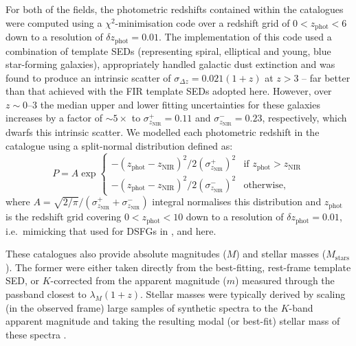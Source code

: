 \documentclass[a4paper, fleqn, usenatbib]{mnras}
\newcommand{\angstrom}{\text{\AA}}
\newcommand{\mstars}{M_{\text{stars}}}
\newcommand{\znir}{z_{\text{NIR}}}
\newcommand{\zphot}{z_{\text{phot}}}
\begin{document}
For both of the fields, the photometric redshifts contained within the catalogues were computed using a $\chi^2$-minimisation code \citep{arnouts99} over a redshift grid of $0<\zphot{}<6$ down to a resolution of $\delta \zphot{}= 0.01$.
The implementation of this code used a combination of template SEDs (representing spiral, elliptical and young, blue star-forming galaxies), appropriately handled galactic dust extinction and was found to produce an intrinsic scatter of $\sigma_{\Delta z}=0.021(1+z)$ at $z>3$ -- far better than that achieved with the FIR template SEDs adopted here.
However, over $z\sim0\text{--}3$ the median upper and lower fitting uncertainties for these galaxies increases by a factor of $\sim5\times$ to $\sigma^{+}_{\znir{}}=0.11$ and $\sigma^{-}_{\znir{}}=0.23$, respectively, which dwarfs this intrinsic scatter.
We modelled each photometric redshift in the catalogue using a split-normal distribution defined as:
\begin{equation}
    \label{eq:split_normal}
    P =
    A\exp\begin{cases}
        -(\zphot{} - \znir{})^2/2({\sigma^{+}_{\znir{}}})^{2} & \text{if }\zphot{}>\znir{}\\
        -(\zphot{} - \znir{})^2/2({\sigma^{-}_{\znir{}}})^{2} & \text{otherwise},
    \end{cases}
\end{equation}
where $A=\sqrt{2/\pi}/(\sigma^{+}_{\znir{}}+\sigma^{-}_{\znir{}})$ integral normalises this distribution and $\zphot{}$ is the redshift grid covering $0<\zphot{}<10$ down to a resolution of $\delta \zphot{}= 0.01$, i.e.\ mimicking that used for DSFGs in ,  and here.

These catalogues also provide absolute magnitudes ($M$) and stellar masses ($\mstars{}$).
The former were either taken directly from the best-fitting, rest-frame template SED, or $K$-corrected from the apparent magnitude ($m$) measured through the passband closest to $\lambda_{M}(1+z)$.
Stellar masses were typically derived by scaling (in the observed frame) large samples of synthetic spectra to the $K$-band apparent magnitude and taking the resulting modal (or best-fit) stellar mass of these spectra \citep[e.g.][]{mortlock13, mortlock15}.
\end{document}
